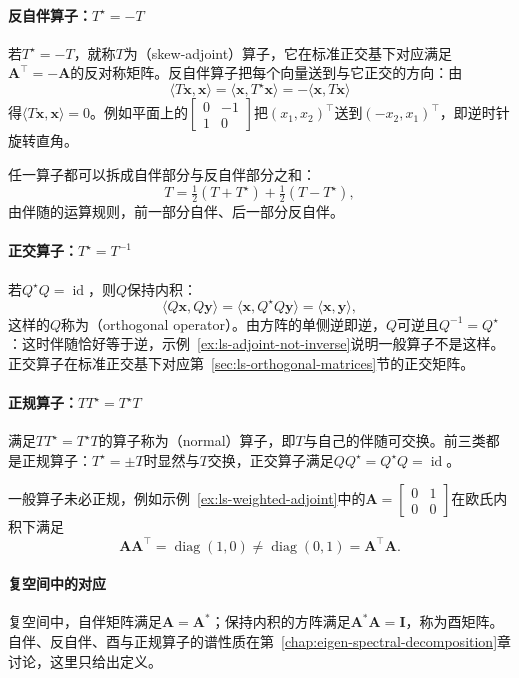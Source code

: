 \paragraph{反自伴算子：$T^\star=-T$}
若$T^\star=-T$，就称$T$为（skew-adjoint）算子，它在标准正交基下对应满足$\bm A^\top=-\bm A$的反对称矩阵。反自伴算子把每个向量送到与它正交的方向：由
\[
 \langle T\bm x,\bm x\rangle=\langle\bm x,T^\star\bm x\rangle=-\langle\bm x,T\bm x\rangle
\]
得$\langle T\bm x,\bm x\rangle=0$。例如平面上的$\left[\begin{smallmatrix}0&-1\\1&0\end{smallmatrix}\right]$把$(x_1,x_2)^\top$送到$(-x_2,x_1)^\top$，即逆时针旋转直角。

任一算子都可以拆成自伴部分与反自伴部分之和：
\[
 T=\tfrac12(T+T^\star)+\tfrac12(T-T^\star),
\]
由伴随的运算规则，前一部分自伴、后一部分反自伴。

\paragraph{正交算子：$T^\star=T^{-1}$}
若$Q^\star Q=\operatorname{id}$，则$Q$保持内积：
\[
 \langle Q\bm x,Q\bm y\rangle=\langle\bm x,Q^\star Q\bm y\rangle=\langle\bm x,\bm y\rangle,
\]
这样的$Q$称为（orthogonal operator）。由方阵的单侧逆即逆，$Q$可逆且$Q^{-1}=Q^\star$：这时伴随恰好等于逆，示例~\ref{ex:ls-adjoint-not-inverse}说明一般算子不是这样。正交算子在标准正交基下对应第~\ref{sec:ls-orthogonal-matrices}节的正交矩阵。

\paragraph{正规算子：$TT^\star=T^\star T$}
满足$TT^\star=T^\star T$的算子称为（normal）算子，即$T$与自己的伴随可交换。前三类都是正规算子：$T^\star=\pm T$时显然与$T$交换，正交算子满足$QQ^\star=Q^\star Q=\operatorname{id}$。

一般算子未必正规，例如示例~\ref{ex:ls-weighted-adjoint}中的$\bm A=\left[\begin{smallmatrix}0&1\\0&0\end{smallmatrix}\right]$在欧氏内积下满足
\[
 \bm A\bm A^\top=\operatorname{diag}(1,0)\neq\operatorname{diag}(0,1)=\bm A^\top\bm A .
\]

\paragraph{复空间中的对应}
复空间中，自伴矩阵满足$\bm A=\bm A^*$；保持内积的方阵满足$\bm A^*\bm A=\bm I$，称为酉矩阵。自伴、反自伴、酉与正规算子的谱性质在第~\ref{chap:eigen-spectral-decomposition}章讨论，这里只给出定义。
